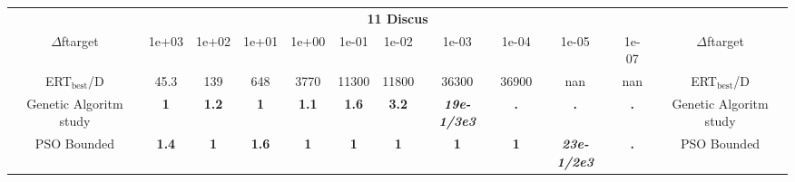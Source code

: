 \begin{tabular}{cccccccccccc}
 & \multicolumn{10}{c}{{\normalsize \textbf{11 Discus}}}\\
$\Delta$ftarget& 1e+03& 1e+02& 1e+01& 1e+00& 1e-01& 1e-02& 1e-03& 1e-04& 1e-05& 1e-07 & $\Delta$ftarget \\
ERT$_{\textrm{best}}$/D& 45.3& 139& 648& 3770& 11300& 11800& 36300& 36900& nan& nan & ERT$_{\textrm{best}}$/D \\
\hline
Genetic Algoritm study & \textbf{1} & \textbf{1.2} & \textbf{1} & \textbf{1.1} & \textbf{1.6} & \textbf{3.2} & \textbf{\textit{19e-1}\textit{/3e3}} & \textbf{.} & \textbf{.} & \textbf{.} & Genetic Algoritm study \cite{add_an_entry_for_Genetic Algoritm study_in_bbob.bib}\\
PSO Bounded & \textbf{1.4} & \textbf{1} & \textbf{1.6} & \textbf{1} & \textbf{1} & \textbf{1} & \textbf{1} & \textbf{1} & \textbf{\textit{23e-1}\textit{/2e3}} & \textbf{.} & PSO Bounded \cite{add_an_entry_for_PSO Bounded_in_bbob.bib}
\end{tabular}
